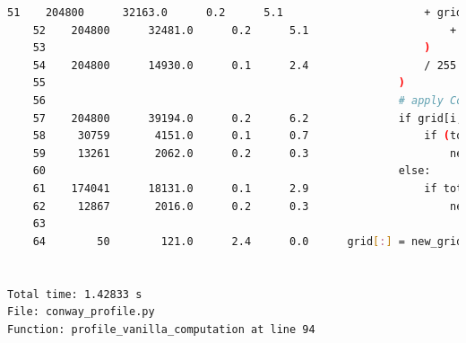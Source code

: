 \documentclass[a4paper,12pt]{article}
\begin{document}
\begin{lstlisting}[language=bash,basicstyle=\tiny\ttfamily]
    51    204800      32163.0      0.2      5.1                      + grid[(i + 1) % n, (j - 1) % n]                                       
    52    204800      32481.0      0.2      5.1                      + grid[(i + 1) % n, (j + 1) % n]                                       
    53                                                           )                                                                          
    54    204800      14930.0      0.1      2.4                  / 255                                                                      
    55                                                       )                                                                              
    56                                                       # apply Conway's rules                                                         
    57    204800      39194.0      0.2      6.2              if grid[i, j] == ON:                                                           
    58     30759       4151.0      0.1      0.7                  if (total < 2) or (total > 3):                                             
    59     13261       2062.0      0.2      0.3                      new_grid[i, j] = OFF                                                   
    60                                                       else:                                                                          
    61    174041      18131.0      0.1      2.9                  if total == 3:                                                             
    62     12867       2016.0      0.2      0.3                      new_grid[i, j] = ON                                                    
    63                                                                                                                                      
    64        50        121.0      2.4      0.0      grid[:] = new_grid[:]                                                                  


Total time: 1.42833 s
File: conway_profile.py
Function: profile_vanilla_computation at line 94


\end{lstlisting}
\end{document}
